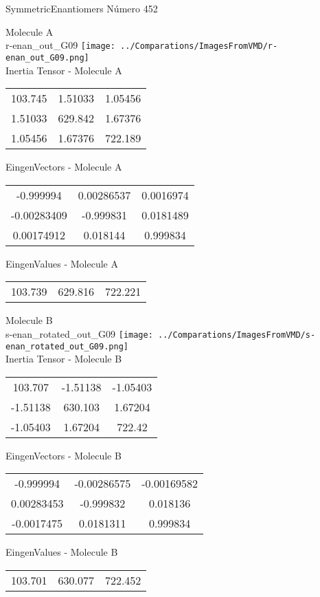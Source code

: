 \vtab[-2cm]
\begin{center}
{\large SymmetricEnantiomers \tab Número 452}
\end{center}
\begin{multicols}{2}
\begin{center}

Molecule A \\ 
r-enan\_out\_G09
\texttt{[image: ../Comparations/ImagesFromVMD/r-enan\_out\_G09.png]}
\\
Inertia Tensor - Molecule A \\
\vtab

\begin{tabular}{|c c c|}
103.745	 & 	1.51033	 & 	1.05456	 \\
1.51033	 & 	629.842	 & 	1.67376	 \\
1.05456	 & 	1.67376	 & 	722.189
\end{tabular}

\vtab
 EingenVectors - Molecule A     \\
\vtab
\begin{tabular}{|c c c|}
-0.999994	 & 	0.00286537	 & 	0.0016974	 \\
-0.00283409	 & 	-0.999831	 & 	0.0181489	 \\
0.00174912	 & 	0.018144	 & 	0.999834
\end{tabular}

\vtab
 EingenValues - Molecule A     \\
\vtab
\begin{tabular}{|c c c|}
103.739	 & 	629.816	 & 	722.221	 \\
\end{tabular}
\columnbreak

Molecule B \\ 
s-enan\_rotated\_out\_G09
\texttt{[image: ../Comparations/ImagesFromVMD/s-enan\_rotated\_out\_G09.png]}
\\
Inertia Tensor - Molecule B \\
\vtab

\begin{tabular}{|c c c|}
103.707	 & 	-1.51138	 & 	-1.05403	 \\
-1.51138	 & 	630.103	 & 	1.67204	 \\
-1.05403	 & 	1.67204	 & 	722.42
\end{tabular}

\vtab
 EingenVectors - Molecule B     \\
\vtab
\begin{tabular}{|c c c|}
-0.999994	 & 	-0.00286575	 & 	-0.00169582	 \\
0.00283453	 & 	-0.999832	 & 	0.018136	 \\
-0.0017475	 & 	0.0181311	 & 	0.999834
\end{tabular}

\vtab
 EingenValues - Molecule B     \\
\vtab
\begin{tabular}{|c c c|}
103.701	 & 	630.077	 & 	722.452	 \\
\end{tabular}

\end{center}
\end{multicols}
